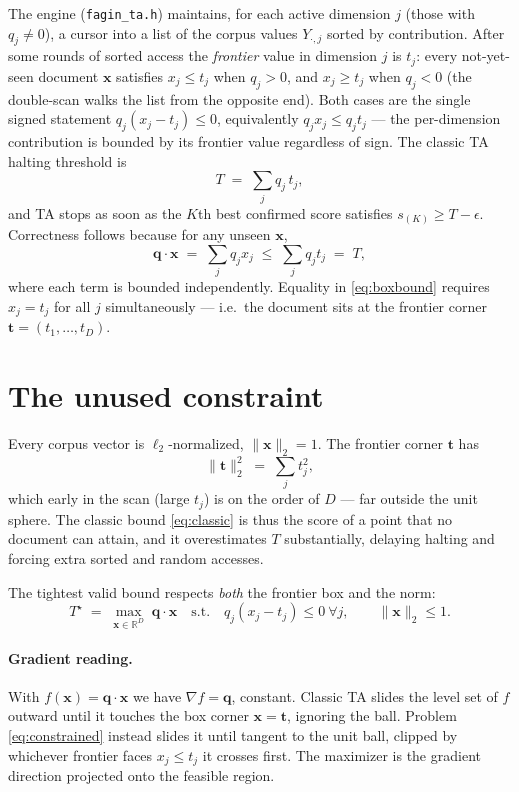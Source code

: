 \documentclass[11pt,a4paper]{article}
\newcommand{\qv}{\mathbf{q}}
\newcommand{\xv}{\mathbf{x}}
\newcommand{\tv}{\mathbf{t}}
\newcommand{\R}{\mathbb{R}}
\newcommand{\norm}[1]{\lVert #1 \rVert}
\begin{document}
The engine (\texttt{fagin\_ta.h}) maintains, for each active dimension
$j$ (those with $q_j\neq0$), a cursor into a list of the corpus values
$Y_{\cdot,j}$ sorted by contribution. After some rounds of sorted access the
\emph{frontier} value in dimension $j$ is $t_j$: every not-yet-seen document
$\xv$ satisfies $x_j\le t_j$ when $q_j>0$, and $x_j\ge t_j$ when $q_j<0$ (the
double-scan walks the list from the opposite end). Both cases are the single
signed statement $q_j(x_j-t_j)\le0$, equivalently $q_j x_j\le q_j t_j$ --- the
per-dimension contribution is bounded by its frontier value regardless of sign.
The classic TA halting
threshold is
\begin{equation}
  T \;=\; \sum_{j} q_j\, t_j,
  \label{eq:classic}
\end{equation}
and TA stops as soon as the $K$th best confirmed score satisfies
$s_{(K)} \ge T-\epsilon$. Correctness follows because for any unseen $\xv$,
\begin{equation}
  \qv\cdot\xv \;=\; \sum_j q_j x_j \;\le\; \sum_j q_j t_j \;=\; T ,
  \label{eq:boxbound}
\end{equation}
where each term is bounded independently. Equality in \eqref{eq:boxbound}
requires $x_j=t_j$ for all $j$ simultaneously --- i.e.\ the document sits at the
frontier corner $\tv=(t_1,\dots,t_D)$.

\section{The unused constraint}

Every corpus vector is $\ell_2$-normalized, $\norm{\xv}_2=1$. The frontier corner
$\tv$ has
\begin{equation}
  \norm{\tv}_2^2 \;=\; \sum_j t_j^2 ,
\end{equation}
which early in the scan (large $t_j$) is on the order of $D$ --- far outside the
unit sphere. The classic bound \eqref{eq:classic} is thus the score of a point
that no document can attain, and it overestimates $T$ substantially, delaying
halting and forcing extra sorted and random accesses.

The tightest valid bound respects \emph{both} the frontier box and the norm:
\begin{equation}
  T^\star \;=\; \max_{\xv\in\R^D}\; \qv\cdot\xv
  \quad\text{s.t.}\quad q_j(x_j-t_j)\le0\ \forall j,\qquad \norm{\xv}_2\le 1 .
  \label{eq:constrained}
\end{equation}

\paragraph{Gradient reading.} With $f(\xv)=\qv\cdot\xv$ we have
$\nabla f=\qv$, constant. Classic TA slides the level set of $f$ outward until it
touches the box corner $\xv=\tv$, ignoring the ball. Problem
\eqref{eq:constrained} instead slides it until tangent to the unit ball, clipped
by whichever frontier faces $x_j\le t_j$ it crosses first. The maximizer is the
gradient direction projected onto the feasible region.
\end{document}
